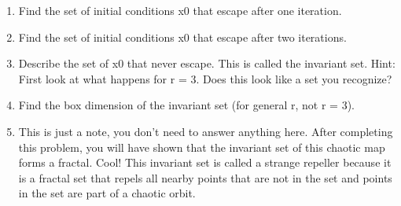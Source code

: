 \documentclass[10pt]{amsart}
\theoremstyle{nonumberplain}
\begin{document}
\begin{enumerate}[label={\bf {\arabic*}:}]
\begin{enumerate}
\item Find the set of initial conditions x0 that escape after one iteration. \\
\item Find the set of initial conditions x0 that escape after two iterations. \\
\item Describe the set of x0 that never escape. This is called the invariant set. 
Hint: First look at what happens for r = 3. Does this look like a set you 
recognize? \\
\item Find the box dimension of the invariant set (for general r, not r = 3). \\
\item This is just a note, you don’t need to answer anything here. After completing
this problem, you will have shown that the invariant set of this chaotic map
forms a fractal. Cool! This invariant set is called a strange repeller because it
is a fractal set that repels all nearby points that are not in the set and points
in the set are part of a chaotic orbit.

\end{enumerate}

\end{enumerate}
\end{document}
